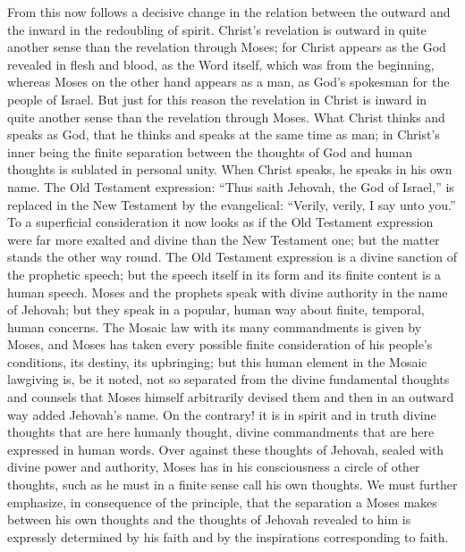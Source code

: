 \documentclass[12pt]{book}
\newcommand{\opage}[1]{\marginnote{\footnotesize\textit{[#1]}}}
\begin{document}
From this now follows a decisive change in the relation between the
outward and the inward in the redoubling of spirit. Christ's revelation is
outward in quite another sense than the revelation through Moses; for
Christ appears as the God revealed in flesh and blood, as the Word itself,
which was from the beginning, whereas Moses on the other hand appears as a
man, as God's spokesman for the people of Israel. But just for this reason
the revelation in Christ is inward in quite another sense than the
revelation through Moses. What
\opage{191}\setcounter{footnote}{0}%
Christ thinks and speaks as God, that he thinks and speaks at the same
time as man; in Christ's inner being the finite separation between the
thoughts of God and human thoughts is sublated in personal unity. When
Christ speaks, he speaks in his own name. The Old Testament expression:
``Thus saith Jehovah, the God of Israel,'' is replaced in the New
Testament by the evangelical: ``Verily, verily, I say unto you.'' To a
superficial consideration it now looks as if the Old Testament expression
were far more exalted and divine than the New Testament one; but the
matter stands the other way round. The Old Testament expression is a
divine sanction of the prophetic speech; but the speech itself in its form
and its finite content is a human speech. Moses and the prophets speak
with divine authority in the name of Jehovah; but they speak in a popular,
human way about finite, temporal, human concerns. The Mosaic law with its
many commandments is given by Moses, and Moses has taken every possible
finite consideration of his people's conditions, its destiny, its
upbringing; but this human element in the Mosaic lawgiving is, be it
noted, not so separated from the divine fundamental thoughts and counsels
that Moses himself arbitrarily devised them and then in an outward way
added Jehovah's name. On the contrary! it is in spirit and in truth divine
thoughts that are here humanly thought, divine commandments that are here
expressed in human words. Over against these thoughts of Jehovah, sealed
with divine power and authority, Moses has in his consciousness a circle
of other thoughts, such as he must in a finite sense call his own
thoughts. We must further emphasize, in consequence of the principle, that
the separation a Moses makes between his own thoughts and the thoughts of
Jehovah revealed to him is
\opage{192}\setcounter{footnote}{0}%
expressly determined by his faith and by the inspirations corresponding to
faith.
\end{document}

